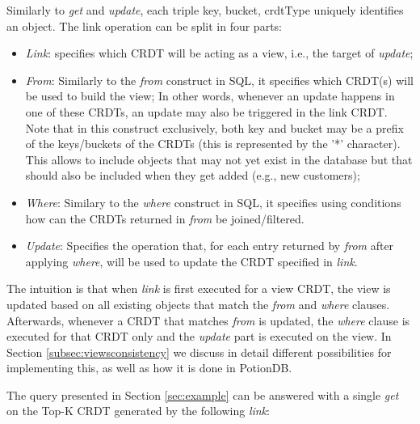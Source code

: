 \documentclass{vldb}
\begin{document}
Similarly to \emph{get} and \emph{update}, each triple key, bucket, crdtType uniquely identifies an object.
The link operation can be split in four parts:

\begin{itemize}
	\item \emph{Link}: specifies which CRDT will be acting as a view, i.e., the target of  \emph{update};
	\item \emph{From}: Similarly to the \emph{from} construct in SQL, it specifies which CRDT(s) will be used to build the view;
	In other words, whenever an update happens in one of these CRDTs, an update may also be triggered in the link CRDT.
	Note that in this construct exclusively, both key and bucket may be a prefix of the keys/buckets of the CRDTs (this is represented by the '*' character).
	This allows to include objects that may not yet exist in the database but that should also be included when they get added (e.g., new customers);
	\item \emph{Where}: Similary to the \emph{where} construct in SQL, it specifies using conditions how can the CRDTs returned in \emph{from} be joined/filtered. %
	\item \emph{Update}: Specifies the operation that, for each entry returned by \emph{from} after applying \emph{where}, will be used to update the CRDT specified in \emph{link}.
\end{itemize}

The intuition is that when \emph{link} is first executed for a view CRDT, the view is updated based on all existing objects that match the \emph{from} and \emph{where} clauses.
Afterwards, whenever a CRDT that matches \emph{from} is updated, the \emph{where} clause is executed for that CRDT only and the \emph{update} part is executed on the view.
In Section \ref{subsec:viewsconsistency} we discuss in detail different possibilities for implementing this, as well as how it is done in PotionDB. %

The query presented in Section \ref{sec:example} can be answered with a single \emph{get} on the Top-K CRDT generated by the following \emph{link}:
\end{document}
